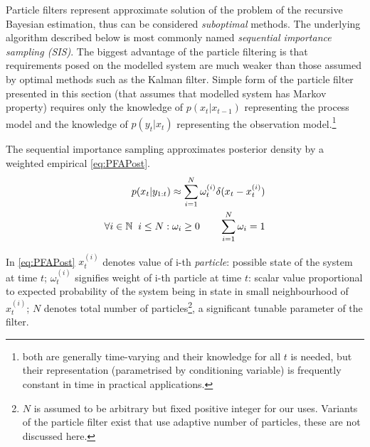 Particle filters represent approximate solution of the problem of the recursive Bayesian estimation,
thus can be considered \emph{suboptimal} methods. The underlying algorithm described below is most
commonly named \emph{sequential importance sampling (SIS)}. The biggest advantage of the particle filtering
is that requirements posed on the modelled system are much weaker than those assumed by optimal methods
such as the Kalman filter. Simple form of the particle filter presented in this section (that assumes that
modelled system has Markov property) requires only the knowledge of {\pdf} \(p(x_t|x_{t-1})\)
representing the process model and the knowledge of \(p(y_t|x_t)\) representing the observation
model.\footnote{both {\pdfs} are generally time-varying and their knowledge for all \(t\) is needed,
but their representation (parametrised by conditioning variable) is frequently constant in time in
practical applications.}

The sequential importance sampling approximates posterior density by a weighted empirical
{\pdf} \eqref{eq:PFAPost}.
\begin{align}
	p(x_t | y_{1:t}) \approx \sum_{i=1}^N \omega_t^{(i)} \delta(x_t - x_t^{(i)}) \label{eq:PFAPost} \\
	\forall i \in \mathbb{N} \;\; i \leq N: \omega_i \geq 0 \quad\quad \sum_{i=1}^N \omega_i = 1 \notag
\end{align}

In \eqref{eq:PFAPost} \(x_t^{(i)}\) denotes value of i-th \emph{particle}: possible state of the
system at time \(t\);
\(\omega_t^{(i)}\) signifies weight of i-th particle at time \(t\): scalar value proportional to
expected probability of the system being in state in small neighbourhood of \(x_t^{(i)}\);
\(N\) denotes total number of particles\footnote{\(N\) is assumed to be
arbitrary but fixed positive integer for our uses. Variants of the particle filter exist that use
adaptive number of particles, these are not discussed here.}, a significant tunable parameter
of the filter.

